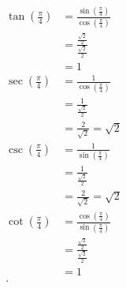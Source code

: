 \begin{solution}
	\label{sol:find_tan_sec_csc_cot_2}

	\begin{align*}
		\tan \left(\frac{\pi}{4}\right) & = \frac{\sin \left(\frac{\pi}{4}\right)}{\cos \left(\frac{\pi}{4}\right)} \\
		                                & = \frac{\frac{\sqrt{2}}{2}}{\frac{\sqrt{2}}{2}}                           \\
		                                & = 1                                                                       \\
		\sec \left(\frac{\pi}{4}\right) & = \frac{1}{\cos \left(\frac{\pi}{4}\right)}                               \\
		                                & = \frac{1}{\frac{\sqrt{2}}{2}}                                            \\
		                                & = \frac{2}{\sqrt{2}} = \sqrt{2}                                           \\
		\csc \left(\frac{\pi}{4}\right) & = \frac{1}{\sin \left(\frac{\pi}{4}\right)}                               \\
		                                & = \frac{1}{\frac{\sqrt{2}}{2}}                                            \\
		                                & = \frac{2}{\sqrt{2}} = \sqrt{2}                                           \\
		\cot \left(\frac{\pi}{4}\right) & = \frac{\cos \left(\frac{\pi}{4}\right)}{\sin \left(\frac{\pi}{4}\right)} \\
		                                & = \frac{\frac{\sqrt{2}}{2}}{\frac{\sqrt{2}}{2}}                           \\
		                                & = 1                                                                       \\
		.\end{align*}
\end{solution}

